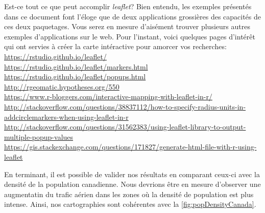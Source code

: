 \begin{moreInfo}{Est-ce tout ce que peut accomplir \emph{leaflet}?}
	Bien entendu, les exemples présentés dans ce document font l'éloge que de deux applications grossières des capacités de ces deux paquetages. Vous serez en mesure d'aisément trouver plusieurs autres exemples d'applications sur le web. Pour l'instant, voici quelques pages d'intérêt qui ont servies à créer la carte intéractive pour amorcer vos recherches: \\
	\url{https://rstudio.github.io/leaflet/} \\
	\url{https://rstudio.github.io/leaflet/markers.html} \\
	\url{https://rstudio.github.io/leaflet/popups.html} \\
	\url{http://rgeomatic.hypotheses.org/550} \\
	\url{https://www.r-bloggers.com/interactive-mapping-with-leaflet-in-r/} \\
	\url{http://stackoverflow.com/questions/38837112/how-to-specify-radius-units-in-addcirclemarkers-when-using-leaflet-in-r} \\
	\url{http://stackoverflow.com/questions/31562383/using-leaflet-library-to-output-multiple-popup-values} \\
	\url{https://gis.stackexchange.com/questions/171827/generate-html-file-with-r-using-leaflet}
\end{moreInfo}

\noindent
En terminant, il est possible de valider nos résultats en comparant ceux-ci avec la densité de la population canadienne. Nous devrions être en mesure d'observer une augmentatin du trafic aérien dans les zones où la densité de population est plus intense. Ainsi, nos cartographies sont cohérentes avec la \autoref{fig:popDensityCanada}.

